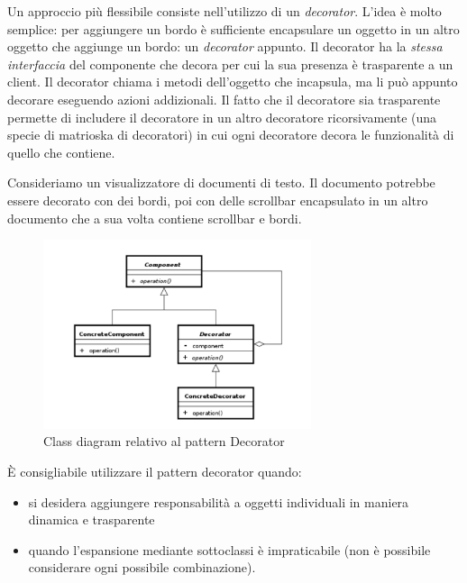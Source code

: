 \documentclass{article}
\begin{document}
Un approccio pi\`u flessibile consiste nell'utilizzo di un \emph{decorator}. L'idea \`e molto semplice: per aggiungere un bordo \`e sufficiente encapsulare un oggetto in un altro oggetto che aggiunge un bordo: un \emph{decorator} appunto. Il decorator ha la \emph{stessa interfaccia} del componente che decora per cui la sua presenza \`e trasparente a un client. Il decorator chiama i metodi dell'oggetto che incapsula, ma li pu\`o appunto decorare eseguendo azioni addizionali. Il fatto che il decoratore sia trasparente permette di includere il decoratore in un altro decoratore ricorsivamente (una specie di matrioska di decoratori) in cui ogni decoratore decora le funzionalit\`a di quello che contiene.

Consideriamo un visualizzatore di documenti di testo. Il documento potrebbe essere decorato con dei bordi, poi con delle scrollbar encapsulato in un altro documento che a sua volta contiene scrollbar e bordi.




\begin{figure}[h]
\centering
\includegraphics[width=0.7\textwidth]{Img/Decorator.pdf}
\caption{Class diagram relativo al pattern Decorator}
\label{Fig:DecoratorConcepts}
\end{figure}

\`E consigliabile utilizzare il pattern decorator quando:
\begin{itemize}
\item si desidera aggiungere responsabilit\`a a oggetti individuali in maniera dinamica e trasparente
\item quando l'espansione mediante sottoclassi \`e impraticabile (non \`e possibile considerare ogni possibile combinazione).
\end{itemize}
\end{document}
